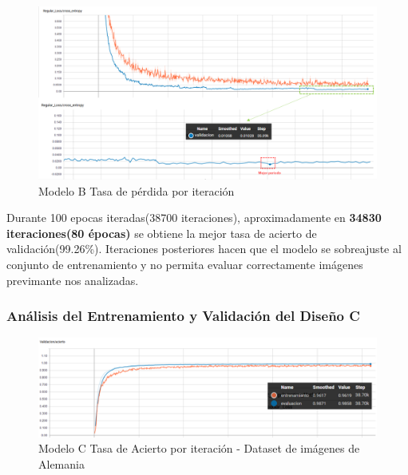 			
			\begin{figure}[H]
				\begin{center}
				\includegraphics[width=1\textwidth]{images/desarrollo/trainResults/model1Loss} 
				\end{center}
				\begin{center}
				\caption{\small{Modelo B Tasa de pérdida por iteración}}
				\vspace{-1em}
				{\small{\fontsize{10}{16.8}\selectfont {Fuente propia}}}
				\end{center}
				\vspace{-1.5em}
			\end{figure}

			Durante 100 epocas iteradas(38700 iteraciones), aproximadamente en  \textbf{34830 iteraciones(80 épocas)} se obtiene la mejor tasa de acierto de validación(99.26\%). Iteraciones posteriores hacen que el modelo se sobreajuste al conjunto de entrenamiento y no permita evaluar correctamente imágenes previmante nos analizadas.



		\subsubsection{Análisis del Entrenamiento y Validación del Diseño C} 

			\begin{figure}[H]
				\begin{center}
				\includegraphics[width=1\textwidth]{images/desarrollo/trainResults/model4Acierto} 
				\end{center}
				\begin{center}
				\caption{\small{Modelo C Tasa de Acierto por iteración - Dataset de imágenes de Alemania  }}
				\vspace{-1em}
				{\small{\fontsize{10}{16.8}\selectfont {Fuente propia}}}
				\end{center}
				\vspace{-1.5em}
			\end{figure}
			

